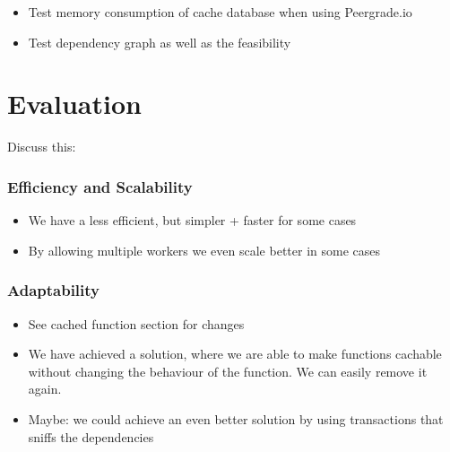 \begin{itemize}
  \item Test memory consumption of cache database when using Peergrade.io
  \item Test dependency graph as well as the feasibility
\end{itemize}



\section{Evaluation}
\label{sec:evaluation}


Discuss this:

\subsubsection{Efficiency and Scalability}
\label{subsubsec:efficiency-and-scalability}

\begin{itemize}
  \item We have a less efficient, but simpler + faster for some cases
  \item By allowing multiple workers we even scale better in some cases
\end{itemize}



\subsubsection{Adaptability}
\label{subsubsec:adaptability}


\begin{itemize}
  \item See cached function section for changes
  \item We have achieved a solution, where we are able to make functions cachable without changing the behaviour of the function. We can easily remove it again.
  \item Maybe: we could achieve an even better solution by using transactions that sniffs the dependencies
\end{itemize}

